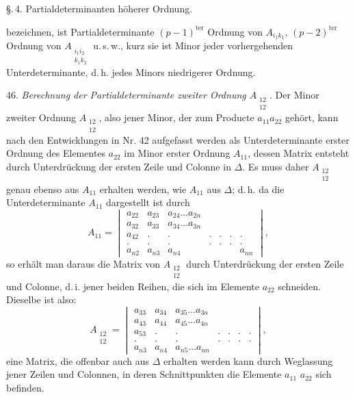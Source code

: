 \S.\,4. Partialdeterminanten höherer Ordnung.

bezeichnen, ist Partialdeterminante $(p-1)^{\text{ter}}$ Ordnung von $A_{i_1k_1}$, $(p-2)^{\text{ter}}$ Ordnung von $A_{\substack{i_1 i_2\\k_1 k_2}}$ u.\,s.\,w., kurz sie ist Minor jeder vorhergehenden Unterdeterminante, d.\,h. jedes Minors niedrigerer Ordnung.

46. \textit{Berechnung der Partialdeterminante zweiter Ordnung $A_{\substack{12\\12}}$.} Der Minor zweiter Ordnung $A_{\substack{12\\12}}$, also jener Minor, der zum Producte $a_{11}a_{22}$ gehört, kann nach den Entwicklungen in Nr. 42 aufgefasst werden als Unterdeterminante erster Ordnung des Elementes $a_{22}$ im Minor erster Ordnung $A_{11}$, dessen Matrix entsteht durch Unterdrückung der ersten Zeile und Colonne in $\varDelta$. Es muss daher $A_{\substack{12\\12}}$ genau ebenso aus $A_{11}$ erhalten werden, wie $A_{11}$ aus $\varDelta$; d.\,h. da die Unterdeterminante $A_{11}$ dargestellt ist durch
\[
A_{11} = \begin{vmatrix} a_{22} & a_{23} & a_{24} \ldots a_{2n}\\ a_{32} & a_{33} & a_{34} \ldots a_{3n}\\ a_{42} & . & . & . & . & . & .\\ . & . & . & . & . & . & .\\ a_{n2} & a_{n3} & a_{n4} & & & & a_{nn} \end{vmatrix},
\]
so erhält man daraus die Matrix von $A_{\substack{12\\12}}$ durch Unterdrückung der ersten Zeile und Colonne, d.\,i. jener beiden Reihen, die sich im Elemente $a_{22}$ schneiden. Dieselbe ist also:
\[
A_{\substack{12\\12}} = \begin{vmatrix} a_{33} & a_{34} & a_{35} \ldots a_{3n}\\ a_{43} & a_{44} & a_{45} \ldots a_{4n}\\ a_{53} & . & . & . & . & . & .\\ . & . & . & . & . & . & .\\ a_{n3} & a_{n4} & a_{n5} \ldots a_{nn} \end{vmatrix},
\]
eine Matrix, die offenbar auch aus $\varDelta$ erhalten werden kann durch Weglassung jener Zeilen und Colonnen, in deren Schnittpunkten die Elemente $a_{11}$ $a_{22}$ sich befinden.

